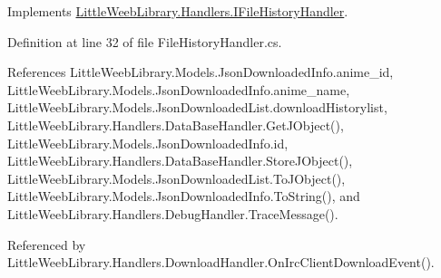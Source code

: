 Implements \mbox{\hyperlink{interface_little_weeb_library_1_1_handlers_1_1_i_file_history_handler_a61ccff04c662692b2ad3f67773c73918}{Little\+Weeb\+Library.\+Handlers.\+I\+File\+History\+Handler}}.



Definition at line 32 of file File\+History\+Handler.\+cs.



References Little\+Weeb\+Library.\+Models.\+Json\+Downloaded\+Info.\+anime\+\_\+id, Little\+Weeb\+Library.\+Models.\+Json\+Downloaded\+Info.\+anime\+\_\+name, Little\+Weeb\+Library.\+Models.\+Json\+Downloaded\+List.\+download\+Historylist, Little\+Weeb\+Library.\+Handlers.\+Data\+Base\+Handler.\+Get\+J\+Object(), Little\+Weeb\+Library.\+Models.\+Json\+Downloaded\+Info.\+id, Little\+Weeb\+Library.\+Handlers.\+Data\+Base\+Handler.\+Store\+J\+Object(), Little\+Weeb\+Library.\+Models.\+Json\+Downloaded\+List.\+To\+J\+Object(), Little\+Weeb\+Library.\+Models.\+Json\+Downloaded\+Info.\+To\+String(), and Little\+Weeb\+Library.\+Handlers.\+Debug\+Handler.\+Trace\+Message().



Referenced by Little\+Weeb\+Library.\+Handlers.\+Download\+Handler.\+On\+Irc\+Client\+Download\+Event().


